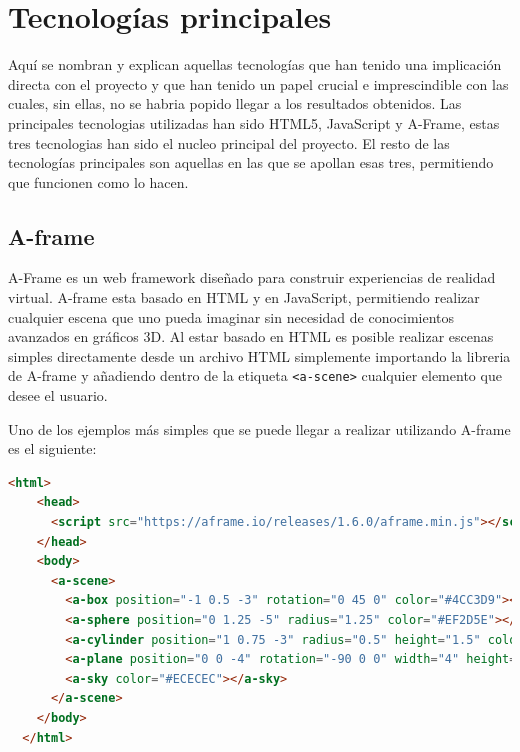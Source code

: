 \documentclass[a4paper, 12pt]{book}
\begin{document}
\section{Tecnologías principales} 
\label{sec:tecnologias-principales} %

Aquí se nombran y explican aquellas tecnologías que han tenido una implicación directa con el proyecto y que han tenido un papel crucial e imprescindible con las cuales, sin ellas, no se habria popido llegar a los resultados obtenidos. 
Las principales tecnologias utilizadas han sido HTML5, JavaScript y A-Frame, estas tres tecnologias han sido el nucleo principal del proyecto. El resto de las tecnologías principales 
son aquellas en las que se apollan esas tres, permitiendo que funcionen como lo hacen. 

\subsection{A-frame}
\label{subsec: A-Frame}

A-Frame \cite{aframe_docs} es un web framework diseñado para construir experiencias de realidad virtual. A-frame esta basado en HTML y en JavaScript, permitiendo realizar cualquier escena que uno pueda imaginar sin necesidad de conocimientos avanzados en gráficos 3D. 
Al estar basado en HTML es posible realizar escenas simples directamente desde un archivo HTML simplemente importando la libreria de A-frame y añadiendo dentro de la etiqueta \texttt{<a-scene>} cualquier elemento que desee el usuario.  

Uno de los ejemplos más simples que se puede llegar a realizar utilizando A-frame es el siguiente:

\begin{lstlisting}[language=HTML, caption=Escena A-Frame básica, captionpos=b]
  <html>
    <head>
      <script src="https://aframe.io/releases/1.6.0/aframe.min.js"></script>
    </head>
    <body>
      <a-scene>
        <a-box position="-1 0.5 -3" rotation="0 45 0" color="#4CC3D9"></a-box>
        <a-sphere position="0 1.25 -5" radius="1.25" color="#EF2D5E"></a-sphere>
        <a-cylinder position="1 0.75 -3" radius="0.5" height="1.5" color="#FFC65D"></a-cylinder>
        <a-plane position="0 0 -4" rotation="-90 0 0" width="4" height="4" color="#7BC8A4"></a-plane>
        <a-sky color="#ECECEC"></a-sky>
      </a-scene>
    </body>
  </html>
\end{lstlisting}
\end{document}
